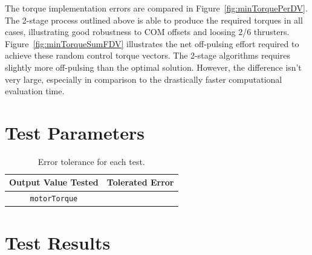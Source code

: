 The torque implementation errors are compared in Figure~\ref{fig:minTorquePerDV}.  The 2-stage process outlined above is able to produce the required torques in all cases, illustrating good robustness to COM offsets and loosing 2/6 thrusters.  Figure~\ref{fig:minTorqueSumFDV} illustrates the net off-pulsing effort required to achieve these random control torque vectors.  The 2-stage algorithms requires slightly more off-pulsing than the optimal solution.  However, the difference isn't very large, especially in comparison to the drastically faster computational evaluation time.  



\section{Test Parameters}


\begin{table}[htbp]
	\caption{Error tolerance for each test.}
	\label{tab:errortol}
	\centering \fontsize{10}{10}\selectfont
	\begin{tabular}{ c | c } %
		\hline\hline
		\textbf{Output Value Tested}  & \textbf{Tolerated Error}  \\ 
		\hline
		{\tt motorTorque}        & 	   \\ 
		\hline\hline
	\end{tabular}
\end{table}




\section{Test Results}

